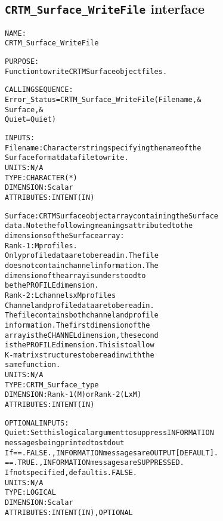 \subsection{\texttt{CRTM\_Surface\_WriteFile} interface}
  \label{sec:CRTM_Surface_WriteFile_interface}
  \begin{alltt}
 
  NAME:
        CRTM_Surface_WriteFile
 
  PURPOSE:
        Function to write CRTM Surface object files.
 
  CALLING SEQUENCE:
        Error_Status = CRTM_Surface_WriteFile( Filename     , &
                                               Surface      , &
                                               Quiet = Quiet  )
 
  INPUTS:
        Filename:     Character string specifying the name of the
                      Surface format data file to write.
                      UNITS:      N/A
                      TYPE:       CHARACTER(*)
                      DIMENSION:  Scalar
                      ATTRIBUTES: INTENT(IN)
 
        Surface:      CRTM Surface object array containing the Surface
                      data. Note the following meanings attributed to the
                      dimensions of the Surface array:
                      Rank-1: M profiles.
                              Only profile data are to be read in. The file
                              does not contain channel information. The
                              dimension of the array is understood to
                              be the PROFILE dimension.
                      Rank-2: L channels  x  M profiles
                              Channel and profile data are to be read in.
                              The file contains both channel and profile
                              information. The first dimension of the
                              array is the CHANNEL dimension, the second
                              is the PROFILE dimension. This is to allow
                              K-matrix structures to be read in with the
                              same function.
                      UNITS:      N/A
                      TYPE:       CRTM_Surface_type
                      DIMENSION:  Rank-1 (M) or Rank-2 (L x M)
                      ATTRIBUTES: INTENT(IN)
 
  OPTIONAL INPUTS:
        Quiet:        Set this logical argument to suppress INFORMATION
                      messages being printed to stdout
                      If == .FALSE., INFORMATION messages are OUTPUT [DEFAULT].
                         == .TRUE.,  INFORMATION messages are SUPPRESSED.
                      If not specified, default is .FALSE.
                      UNITS:      N/A
                      TYPE:       LOGICAL
                      DIMENSION:  Scalar
                      ATTRIBUTES: INTENT(IN), OPTIONAL
 

\end{alltt}
